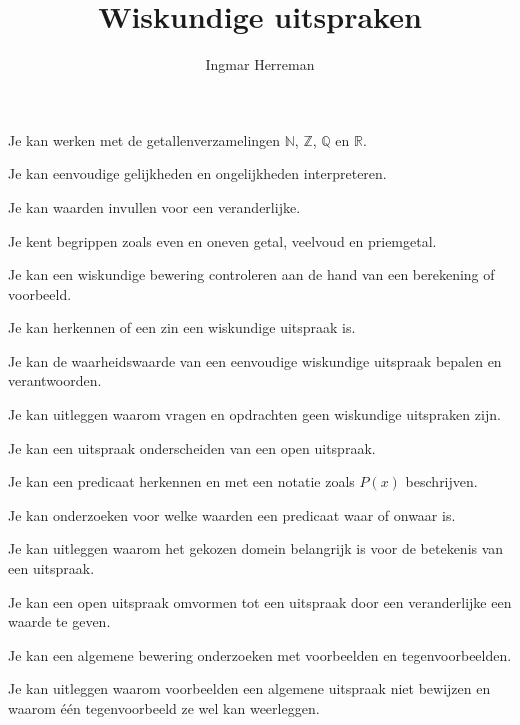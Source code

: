 \documentclass{ximera}
\title{Wiskundige uitspraken}
\author{Ingmar Herreman}
\begin{document}













\maketitle



\begin{voorkennis}
  \item Je kan werken met de getallenverzamelingen
        $\mathbb{N}$, $\mathbb{Z}$, $\mathbb{Q}$ en $\mathbb{R}$.
  \item Je kan eenvoudige gelijkheden en ongelijkheden interpreteren.
  \item Je kan waarden invullen voor een veranderlijke.
  \item Je kent begrippen zoals even en oneven getal, veelvoud en priemgetal.
  \item Je kan een wiskundige bewering controleren aan de hand van een berekening of voorbeeld.
\end{voorkennis}



\begin{leerdoelen}
  \item Je kan herkennen of een zin een wiskundige uitspraak is.
  \item Je kan de waarheidswaarde van een eenvoudige wiskundige uitspraak bepalen en verantwoorden.
  \item Je kan uitleggen waarom vragen en opdrachten geen wiskundige uitspraken zijn.
  \item Je kan een uitspraak onderscheiden van een open uitspraak.
  \item Je kan een predicaat herkennen en met een notatie zoals $P(x)$ beschrijven.
  \item Je kan onderzoeken voor welke waarden een predicaat waar of onwaar is.
  \item Je kan uitleggen waarom het gekozen domein belangrijk is voor de betekenis van een uitspraak.
  \item Je kan een open uitspraak omvormen tot een uitspraak door een veranderlijke een waarde te geven.
  \item Je kan een algemene bewering onderzoeken met voorbeelden en tegenvoorbeelden.
  \item Je kan uitleggen waarom voorbeelden een algemene uitspraak niet bewijzen en waarom één tegenvoorbeeld ze wel kan weerleggen.
\end{leerdoelen}
\end{document}
